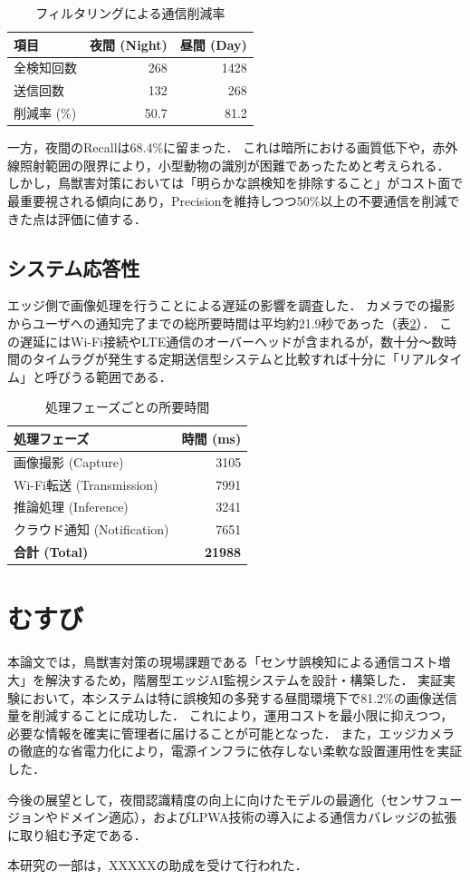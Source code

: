 \documentclass[technicalreport]{ieicej}
\begin{document}
\begin{table}[tb]
  \caption{フィルタリングによる通信削減率}
  \label{tab:comm_reduction}
  \centering
  \begin{tabular}{l|rr}
    \hline
    項目       & 夜間 (Night) & 昼間 (Day) \\
    \hline \hline
    全検知回数    & 268        & 1428     \\
    送信回数     & 132        & 268      \\
    削減率 (\%) & 50.7       & 81.2     \\
    \hline
  \end{tabular}
\end{table}

一方，夜間のRecallは68.4\%に留まった．
これは暗所における画質低下や，赤外線照射範囲の限界により，小型動物の識別が困難であったためと考えられる．
しかし，鳥獣害対策においては「明らかな誤検知を排除すること」がコスト面で最重要視される傾向にあり，Precisionを維持しつつ50\%以上の不要通信を削減できた点は評価に値する．

\subsection{システム応答性}
エッジ側で画像処理を行うことによる遅延の影響を調査した．
カメラでの撮影からユーザへの通知完了までの総所要時間は平均約21.9秒であった（表\ref{tab:latency}）．
この遅延にはWi-Fi接続やLTE通信のオーバーヘッドが含まれるが，数十分〜数時間のタイムラグが発生する定期送信型システムと比較すれば十分に「リアルタイム」と呼びうる範囲である．

\begin{table}[tb]
  \caption{処理フェーズごとの所要時間}
  \label{tab:latency}
  \centering
  \begin{tabular}{l|r}
    \hline
    処理フェーズ                 & 時間 (ms)        \\
    \hline \hline
    画像撮影 (Capture)         & 3105           \\
    Wi-Fi転送 (Transmission) & 7991           \\
    推論処理 (Inference)       & 3241           \\
    クラウド通知 (Notification)  & 7651           \\
    \hline
    \textbf{合計 (Total)}    & \textbf{21988} \\
    \hline
  \end{tabular}
\end{table}

\section{むすび}
本論文では，鳥獣害対策の現場課題である「センサ誤検知による通信コスト増大」を解決するため，階層型エッジAI監視システムを設計・構築した．
実証実験において，本システムは特に誤検知の多発する昼間環境下で81.2\%の画像送信量を削減することに成功した．
これにより，運用コストを最小限に抑えつつ，必要な情報を確実に管理者に届けることが可能となった．
また，エッジカメラの徹底的な省電力化により，電源インフラに依存しない柔軟な設置運用性を実証した．

今後の展望として，夜間認識精度の向上に向けたモデルの最適化（センサフュージョンやドメイン適応），およびLPWA技術の導入による通信カバレッジの拡張に取り組む予定である．

\ack
本研究の一部は，XXXXXの助成を受けて行われた．



\end{document}
